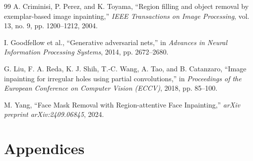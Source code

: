 \documentclass{ipgpmaster}
\begin{document}
\newpage
\begin{thebibliography}{99}
A. Criminisi, P. Perez, and K. Toyama, ``Region filling and object removal by exemplar-based image inpainting,'' \textit{IEEE Transactions on Image Processing}, vol. 13, no. 9, pp. 1200--1212, 2004.

I. Goodfellow et al., ``Generative adversarial nets,'' in \textit{Advances in Neural Information Processing Systems}, 2014, pp. 2672--2680.

G. Liu, F. A. Reda, K. J. Shih, T.-C. Wang, A. Tao, and B. Catanzaro, ``Image inpainting for irregular holes using partial convolutions,'' in \textit{Proceedings of the European Conference on Computer Vision (ECCV)}, 2018, pp. 85--100.

M. Yang, ``Face Mask Removal with Region-attentive Face Inpainting,'' \textit{arXiv preprint arXiv:2409.06845}, 2024.
\end{thebibliography}

\newpage
\section*{Appendices}
\end{document}
